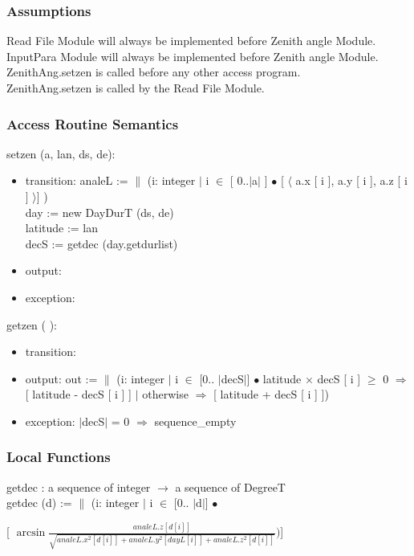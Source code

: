 \documentclass[12pt, titlepage]{article}
\begin{document}
\subsubsection{Assumptions}
Read File Module will always be implemented before Zenith angle Module. \\
InputPara Module will always be implemented before Zenith angle Module.\\
ZenithAng.setzen is called before any other access program.\\
ZenithAng.setzen is called by the Read File Module.


\subsubsection{ Access Routine Semantics}


\noindent setzen (a, lan, ds, de):
\begin{itemize}
\item transition: analeL := $\|$ (i: integer $|$ i $\in$ [ 0..$|$a$|$ ] $\bullet	$ [ $\langle$ a.x [ i ], a.y [ i ], a.z [ i ] $\rangle$] )\\
day := new DayDurT (ds, de)\\
latitude := lan\\
decS := getdec (day.getdurlist)
\item output: 
\item exception: 
\end{itemize}

\noindent  getzen ( ):
\begin{itemize}
\item transition:

\item output: out := $\|$ (i: integer $|$ i $\in$ [0.. $|$decS$|$] $\bullet$ latitude $\times$ decS [ i ] $\geq$ 0 $\Rightarrow$ [ latitude - decS [  i ] ] $|$ otherwise $\Rightarrow$ [ latitude + decS [ i ] ])
\item exception: $|$decS$|$ = 0 $\Rightarrow$ sequence\_empty
\end{itemize}


\subsubsection{Local Functions}
getdec : a sequence of integer $\rightarrow$ a sequence of DegreeT\\
getdec (d) := $\|$ (i: integer $|$ i $\in$ [0.. $|$d$|$] $\bullet$ 
\begin{center}\large
[ $\arcsin \frac{analeL.z [d[ i ] ]}{ \sqrt{analeL.x^2 [ d[ i ] ] + analeL.y^2 [ dayL[ i ] ] + analeL.z^2 [ d[ i ] ]}}) $]
\end{center}
\end{document}
